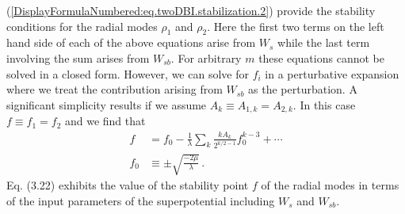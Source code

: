 \documentclass[a4paper,11pt]{article}
\begin{document}
  (\ref{DisplayFormulaNumbered:eq.twoDBI.stabilization.2})    
  provide the stability conditions  for the radial modes $\rho_1$ and $\rho_2$. 
  Here the first two terms on the left hand side of each of the above equations arise from $W_s$ while the last term involving
  the sum arises from $W_{sb}$. 
  For arbitrary $m$ these equations cannot be solved in a closed form. However, we can solve for $f_i$ in a perturbative
  expansion where we treat the contribution arising from $W_{sb}$ as the perturbation. A significant simplicity results if we
  assume $A_k\equiv A_{1,k}=A_{2,k}$. In this case $f\equiv f_1=f_2$ and   we find that 
    \begin{align}
  f&= f_0 - \frac{1}{\lambda} \sum_{k} \frac{kA_k}{2^{k/2-1} } f_0^{k-3} + \cdots  \nonumber\\
  f_0&\equiv \pm \sqrt{\frac{-2\mu}{\lambda}}\,.
  \end{align}
  Eq. (3.22) exhibits the value of the stability point  $f$ of the radial modes in terms of the input parameters of the superpotential
  including $W_s$ and $W_{sb}$. 
  
\end{document}
